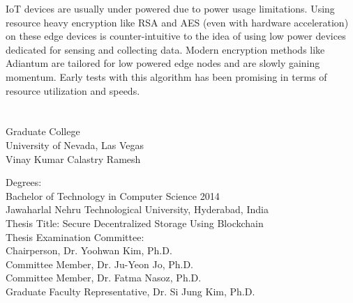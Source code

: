 \documentclass[11pt,openright]{report}
\begin{document}
IoT devices are usually under powered due to power usage limitations. Using resource heavy encryption like RSA and AES (even with hardware acceleration) on these edge devices is counter-intuitive to the idea of using low power devices dedicated for sensing and collecting data. Modern encryption methods like Adiantum \cite{DBLP:journals/tosc/CrowleyB18} are tailored for low powered edge nodes and are slowly gaining momentum. Early tests with this algorithm has been promising in terms of resource utilization and speeds.




\vita
\chapter{} %
\linespread{1.3}
\begin{center}
Graduate College\\
University of Nevada, Las Vegas\\[1cm]
Vinay Kumar Calastry Ramesh\\[1cm]
\end{center}

\noindent Degrees:\\
\indent Bachelor of Technology in Computer Science 2014\\
\indent Jawaharlal Nehru Technological University, Hyderabad, India\\

\noindent Thesis Title: Secure Decentralized Storage Using Blockchain\\

\noindent Thesis Examination Committee:\\
\indent Chairperson, Dr. Yoohwan Kim, Ph.D.\\
\indent Committee Member, Dr. Ju-Yeon Jo, Ph.D.\\
\indent Committee Member, Dr. Fatma Nasoz, Ph.D.\\
\indent Graduate Faculty Representative, Dr. Si Jung Kim, Ph.D.\\
\end{document}

